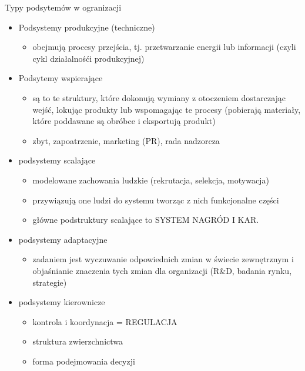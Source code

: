 \documentclass[a4paper,10pt]{report}
\begin{document}
\noindent Typy podsytemów w ogranizacji\\
\begin{itemize}
	\item Podsystemy produkcyjne (techniczne)
	\begin{itemize}
		\item obejmują procesy przejścia, tj. przetwarzanie energii lub informacji (czyli cykl działalnośći produkcyjnej)
	\end{itemize}
	\item Podsytemy wspierające
	\begin{itemize}
		\item są to te struktury, które dokonują wymiany z otoczeniem dostarczając wejść, lokując produkty lub wspomagając te procesy (pobierają materiały, które poddawane są obróbce i eksportują produkt)
		\item zbyt, zapoatrzenie, marketing (PR), rada nadzorcza
	\end{itemize}
	\item podsystemy scalające
	\begin{itemize}
		\item modelowane zachowania ludzkie (rekrutacja, selekcja, motywacja)
		\item przywiązują one ludzi do systemu tworząc z nich funkcjonalne części
		\item główne podstruktury scalające to SYSTEM NAGRÓD I KAR.
	\end{itemize}
	\item podsystemy adaptacyjne
	\begin{itemize}
		\item zadaniem jest wyczuwanie odpowiednich zmian w świecie zewnętrznym i objaśnianie znaczenia tych zmian dla organizacji (R\&D, badania rynku, strategie)
	\end{itemize}
	\item podsystemy kierownicze
	\begin{itemize}
		\item kontrola i koordynacja = REGULACJA
		\item struktura zwierzchnictwa
		\item forma podejmowania decyzji
	\end{itemize}
\end{itemize}
\end{document}
